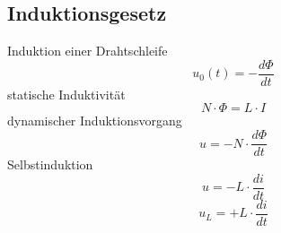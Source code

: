 



\subsection{Induktionsgesetz}
Induktion einer Drahtschleife
\[ u_0(t) = -\frac{d \Phi}{d t} \]
statische Induktivität
\[ N \cdot \Phi = L \cdot I \]
dynamischer Induktionsvorgang
\[ u = - N \cdot \frac{d \Phi}{d t} \]
Selbstinduktion
\[ u = - L  \cdot \frac{d i}{d t} \]
\[ u_L = + L  \cdot \frac{d i}{d t} \]